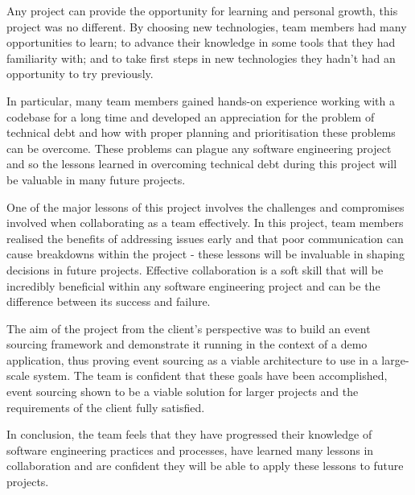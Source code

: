 \documentclass{l3proj}
\begin{document}
Any project can provide the opportunity for learning and personal growth, this project was no different. By choosing new technologies, team members had many opportunities to learn; to advance their knowledge in some tools that they had familiarity with; and to take first steps in new technologies they hadn't had an opportunity to try previously.

In particular, many team members gained hands-on experience working with a codebase for a long time and developed an appreciation for the problem of technical debt and how with proper planning and prioritisation these problems can be overcome. These problems can plague any software engineering project and so the lessons learned in overcoming technical debt during this project will be valuable in many future projects.

One of the major lessons of this project involves the challenges and compromises involved when collaborating as a team effectively. In this project, team members realised the benefits of addressing issues early and that poor communication can cause breakdowns within the project - these lessons will be invaluable in shaping decisions in future projects. Effective collaboration is a soft skill that will be incredibly beneficial within any software engineering project and can be the difference between its success and failure.

The aim of the project from the client's perspective was to build an event sourcing framework and demonstrate it running in the context of a demo application, thus proving event sourcing as a viable architecture to use in a large-scale system. The team is confident that these goals have been accomplished, event sourcing shown to be a viable solution for larger projects and the requirements of the client fully satisfied.

In conclusion, the team feels that they have progressed their knowledge of software engineering practices and processes, have learned many lessons in collaboration and are confident they will be able to apply these lessons to future projects.




\end{document}
